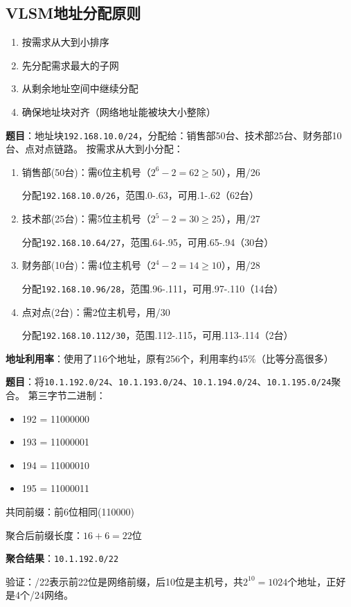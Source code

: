\documentclass[12pt,a4paper,openany]{ctexbook}
\begin{document}
\subsection{VLSM地址分配原则}
\begin{enumerate}[leftmargin=2em,itemsep=0pt]
    \item 按需求从大到小排序
    \item 先分配需求最大的子网
    \item 从剩余地址空间中继续分配
    \item 确保地址块对齐（网络地址能被块大小整除）
\end{enumerate}

\begin{examplebox}[例题4.3 VLSM地址分配]
\textbf{题目}：地址块\texttt{192.168.10.0/24}，分配给：销售部50台、技术部25台、财务部10台、点对点链路。
\tcblower
按需求从大到小分配：
\begin{enumerate}[itemsep=0pt]
    \item 销售部(50台)：需6位主机号（$2^6-2=62\geq50$），用/26
    
    分配\texttt{192.168.10.0/26}，范围.0-.63，可用.1-.62（62台）
    \item 技术部(25台)：需5位主机号（$2^5-2=30\geq25$），用/27
    
    分配\texttt{192.168.10.64/27}，范围.64-.95，可用.65-.94（30台）
    \item 财务部(10台)：需4位主机号（$2^4-2=14\geq10$），用/28
    
    分配\texttt{192.168.10.96/28}，范围.96-.111，可用.97-.110（14台）
    \item 点对点(2台)：需2位主机号，用/30
    
    分配\texttt{192.168.10.112/30}，范围.112-.115，可用.113-.114（2台）
\end{enumerate}

\textbf{地址利用率}：使用了116个地址，原有256个，利用率约45\%（比等分高很多）
\end{examplebox}

\begin{examplebox}[例题4.4 路由聚合]
\textbf{题目}：将\texttt{10.1.192.0/24}、\texttt{10.1.193.0/24}、\texttt{10.1.194.0/24}、\texttt{10.1.195.0/24}聚合。
\tcblower
第三字节二进制：
\begin{itemize}[itemsep=0pt]
    \item 192 = 11000000
    \item 193 = 11000001
    \item 194 = 11000010
    \item 195 = 11000011
\end{itemize}

共同前缀：前6位相同(110000)

聚合后前缀长度：$16+6=22$位

\textbf{聚合结果}：\texttt{10.1.192.0/22}

验证：/22表示前22位是网络前缀，后10位是主机号，共$2^{10}=1024$个地址，正好是4个/24网络。
\end{examplebox}
\end{document}
